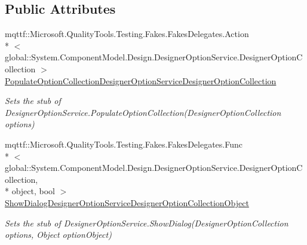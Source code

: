 \subsection*{Public Attributes}
\begin{DoxyCompactItemize}
\item 
mqttf\-::\-Microsoft.\-Quality\-Tools.\-Testing.\-Fakes.\-Fakes\-Delegates.\-Action\\*
$<$ global\-::\-System.\-Component\-Model.\-Design.\-Designer\-Option\-Service.\-Designer\-Option\-Collection $>$ \hyperlink{class_system_1_1_component_model_1_1_design_1_1_fakes_1_1_stub_designer_option_service_a8617ce26de67fb990632f4f837f65409}{Populate\-Option\-Collection\-Designer\-Option\-Service\-Designer\-Option\-Collection}
\begin{DoxyCompactList}\small\item\em Sets the stub of Designer\-Option\-Service.\-Populate\-Option\-Collection(\-Designer\-Option\-Collection options)\end{DoxyCompactList}\item 
mqttf\-::\-Microsoft.\-Quality\-Tools.\-Testing.\-Fakes.\-Fakes\-Delegates.\-Func\\*
$<$ global\-::\-System.\-Component\-Model.\-Design.\-Designer\-Option\-Service.\-Designer\-Option\-Collection, \\*
object, bool $>$ \hyperlink{class_system_1_1_component_model_1_1_design_1_1_fakes_1_1_stub_designer_option_service_abbc1f7e082e7810ec850c1ec31322b13}{Show\-Dialog\-Designer\-Option\-Service\-Designer\-Option\-Collection\-Object}
\begin{DoxyCompactList}\small\item\em Sets the stub of Designer\-Option\-Service.\-Show\-Dialog(\-Designer\-Option\-Collection options, Object option\-Object)\end{DoxyCompactList}\end{DoxyCompactItemize}
